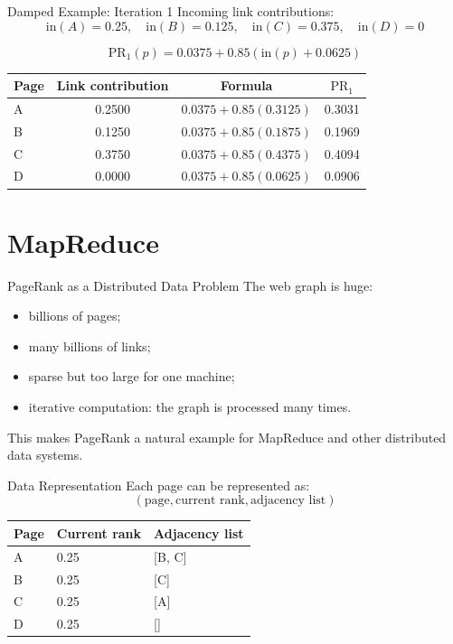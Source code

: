 \documentclass[aspectratio=169,11pt]{beamer}
\newcommand{\PR}{\mathrm{PR}}
\begin{document}
\begin{frame}{Damped Example: Iteration 1}
Incoming link contributions:
\[
\mathrm{in}(A)=0.25,\quad
\mathrm{in}(B)=0.125,\quad
\mathrm{in}(C)=0.375,\quad
\mathrm{in}(D)=0
\]

\[
\PR_1(p)=0.0375+0.85\left(\mathrm{in}(p)+0.0625\right)
\]

\begin{center}
\small
\begin{tabular}{lccc}
\toprule
Page & Link contribution & Formula & \(\PR_1\) \\
\midrule
A & 0.2500 & \(0.0375+0.85(0.3125)\) & 0.3031 \\
B & 0.1250 & \(0.0375+0.85(0.1875)\) & 0.1969 \\
C & 0.3750 & \(0.0375+0.85(0.4375)\) & 0.4094 \\
D & 0.0000 & \(0.0375+0.85(0.0625)\) & 0.0906 \\
\bottomrule
\end{tabular}
\end{center}
\end{frame}

\section{MapReduce}

\begin{frame}{PageRank as a Distributed Data Problem}
The web graph is huge:
\begin{itemize}
  \item billions of pages;
  \item many billions of links;
  \item sparse but too large for one machine;
  \item iterative computation: the graph is processed many times.
\end{itemize}

This makes PageRank a natural example for MapReduce and other distributed data
systems.
\end{frame}

\begin{frame}{Data Representation}
Each page can be represented as:
\[
(\text{page}, \text{current rank}, \text{adjacency list})
\]

\begin{center}
\begin{tabular}{lll}
\toprule
Page & Current rank & Adjacency list \\
\midrule
A & 0.25 & [B, C] \\
B & 0.25 & [C] \\
C & 0.25 & [A] \\
D & 0.25 & [] \\
\bottomrule
\end{tabular}
\end{center}
\end{frame}
\end{document}

